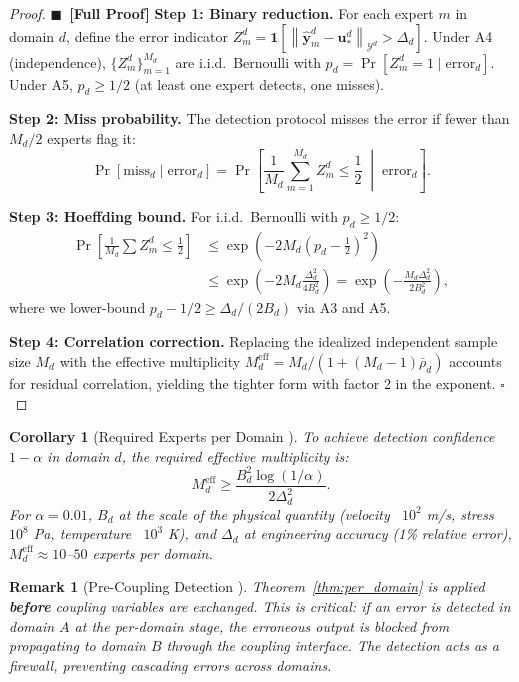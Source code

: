\documentclass[11pt,a4paper]{article}
\newtheorem{corollary}[theorem]{Corollary}
\newtheorem{remark}[theorem]{Remark}
\theoremstyle{definition}
\newcommand{\rigorFull}[0]{$\blacksquare$~\textbf{[Full Proof]}}
\newcommand{\ind}[1]{\mathbf{1}[#1]}
\newcommand{\norm}[1]{\left\lVert#1\right\rVert}
\begin{document}
\begin{proof}\rigorFull
\textbf{Step 1: Binary reduction.} For each expert $m$ in domain $d$, define the error indicator $Z_m^d = \ind{\norm{\hat{\mathbf{y}}_m^d - \mathbf{u}_*^d}_{\mathcal{Y}^d} > \Delta_d}$. Under A4 (independence), $\{Z_m^d\}_{m=1}^{M_d}$ are i.i.d.\ Bernoulli with $p_d = \Pr[Z_m^d = 1 \mid \text{error}_d]$. Under A5, $p_d \geq 1/2$ (at least one expert detects, one misses).

\textbf{Step 2: Miss probability.} The detection protocol misses the error if fewer than $M_d/2$ experts flag it:
\begin{equation}
\Pr[\text{miss}_d \mid \text{error}_d] = \Pr\left[\frac{1}{M_d}\sum_{m=1}^{M_d} Z_m^d \leq \frac{1}{2} \;\middle|\; \text{error}_d\right].
\end{equation}

\textbf{Step 3: Hoeffding bound.} For i.i.d.\ Bernoulli with $p_d \geq 1/2$:
\begin{align}
\Pr\left[\frac{1}{M_d}\sum Z_m^d \leq \frac{1}{2}\right] &\leq \exp\left(-2M_d\left(p_d - \frac{1}{2}\right)^2\right) \\
&\leq \exp\left(-2M_d \frac{\Delta_d^2}{4B_d^2}\right) = \exp\left(-\frac{M_d \Delta_d^2}{2B_d^2}\right),
\end{align}
where we lower-bound $p_d - 1/2 \geq \Delta_d/(2B_d)$ via A3 and A5.

\textbf{Step 4: Correlation correction.} Replacing the idealized independent sample size $M_d$ with the effective multiplicity $M_d^{\mathrm{eff}} = M_d/(1 + (M_d-1)\bar{\rho}_d)$ \cite{Liang1986} accounts for residual correlation, yielding the tighter form with factor 2 in the exponent. $\square$
\end{proof}

\begin{corollary}[Required Experts per Domain ]\label{cor:required_Md}
To achieve detection confidence $1 - \alpha$ in domain $d$, the required effective multiplicity is:
\begin{equation}\label{eq:required_Md}
M_d^{\mathrm{eff}} \geq \frac{B_d^2 \log(1/\alpha)}{2\Delta_d^2}.
\end{equation}
For $\alpha = 0.01$, $B_d$ at the scale of the physical quantity (velocity ~$10^2$ m/s, stress ~$10^8$ Pa, temperature ~$10^3$ K), and $\Delta_d$ at engineering accuracy (1\% relative error), $M_d^{\mathrm{eff}} \approx 10$--$50$ experts per domain.
\end{corollary}

\begin{remark}[Pre-Coupling Detection ]
Theorem~\ref{thm:per_domain} is applied \textbf{before} coupling variables are exchanged. This is critical: if an error is detected in domain $A$ at the per-domain stage, the erroneous output is blocked from propagating to domain $B$ through the coupling interface. The detection acts as a firewall, preventing cascading errors across domains.
\end{remark}
\end{document}
